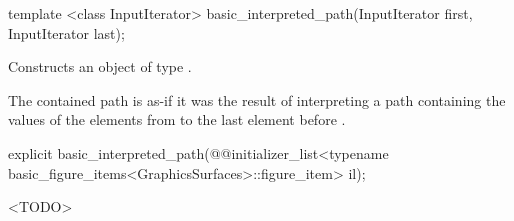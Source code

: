 %
\begin{itemdecl}
template <class InputIterator>
basic_interpreted_path(InputIterator first, InputIterator last);
\end{itemdecl}
\begin{itemdescr}
\pnum
\effects
Constructs an object of type .

\pnum
The contained path is as-if it was the result of interpreting a path containing the values of the elements from  to the last element before .
\end{itemdescr}

%
\begin{itemdecl}
explicit basic_interpreted_path(@\stdqualifier{}@initializer_list<typename
  basic_figure_items<GraphicsSurfaces>::figure_item> il);
\end{itemdecl}
\begin{itemdescr}
\pnum
\effects
<TODO>
\end{itemdescr}

